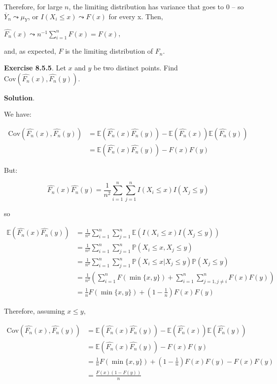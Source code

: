 Therefore, for large \(n\), the limiting distribution has variance that
goes to 0 -- so \(\overline{Y}_n \leadsto \mu_Y\), or
\(I\left(X_i \leq x \right) \leadsto F(x)\) for every x. Then,

\(\hat{F_n}(x) \leadsto n^{-1} \sum_{i=1}^n F(x) = F(x)\),

and, as expected, \(F\) is the limiting distribution of \(F_n\).

\textbf{Exercise 8.5.5}. Let \(x\) and \(y\) be two distinct points.
Find \(\text{Cov}(\hat{F_n}(x), \hat{F_n}(y))\).

\textbf{Solution}.

We have:

\begin{align}
\text{Cov}(\hat{F_n}(x), \hat{F_n}(y)) & = \mathbb{E}(\hat{F_n}(x) \hat{F_n}(y)) - \mathbb{E}(\hat{F_n}(x))\mathbb{E}(\hat{F_n}(y)) \\
&= \mathbb{E}(\hat{F_n}(x) \hat{F_n}(y)) - F(x)F(y)
\end{align}

But:

\[
\hat{F_n}(x) \hat{F_n}(y) = \frac{1}{n^2} \sum_{i=1}^n \sum_{j=1}^n I(X_i \leq x) I(X_j \leq y)
\]

so

\begin{align}
\mathbb{E}(\hat{F_n}(x) \hat{F_n}(y)) & = \frac{1}{n^2} \sum_{i=1}^n \sum_{j=1}^n \mathbb{E}(I(X_i \leq x) I(X_j \leq y)) \\
&= \frac{1}{n^2} \sum_{i=1}^n \sum_{j=1}^n \mathbb{P}(X_i \leq x, X_j \leq y) \\
&= \frac{1}{n^2} \sum_{i=1}^n \sum_{j=1}^n \mathbb{P}(X_i \leq x | X_j \leq y) \mathbb{P}(X_j \leq y) \\
&= \frac{1}{n^2} \left( \sum_{i=1}^n F(\min\{x, y\}) + \sum_{i=1}^n \sum_{j=1, j \neq i}^n F(x)F(y) \right) \\
&= \frac{1}{n} F(\min\{x, y\}) + \left( 1 - \frac{1}{n}\right) F(x)F(y)
\end{align}

Therefore, assuming \(x \leq y\),

\begin{align}
\text{Cov}(\hat{F_n}(x), \hat{F_n}(y)) & = \mathbb{E}(\hat{F_n}(x) \hat{F_n}(y)) - \mathbb{E}(\hat{F_n}(x))\mathbb{E}(\hat{F_n}(y)) \\
&= \mathbb{E}(\hat{F_n}(x) \hat{F_n}(y)) - F(x)F(y) \\
&= \frac{1}{n} F(\min\{x, y\}) + \left( 1 - \frac{1}{n}\right) F(x)F(y) - F(x)F(y) \\
&= \frac{F(x)(1 - F(y))}{n}
\end{align}

